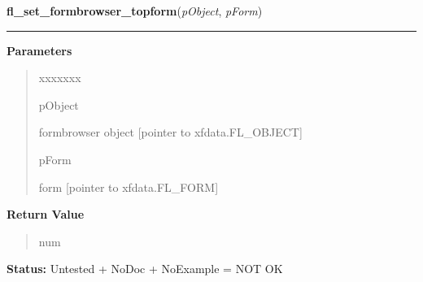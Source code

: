 \hspace{.8\funcindent}\begin{boxedminipage}{\funcwidth}

    \raggedright \textbf{fl\_set\_formbrowser\_topform}(\textit{pObject}, \textit{pForm})

    \vspace{-1.5ex}

    \rule{\textwidth}{0.5\fboxrule}
\setlength{\parskip}{2ex}
\setlength{\parskip}{1ex}
      \textbf{Parameters}
      \vspace{-1ex}

      \begin{quote}
        \begin{Ventry}{xxxxxxx}

          \item[pObject]

          formbrowser object [pointer to xfdata.FL\_OBJECT]

          \item[pForm]

          form [pointer to xfdata.FL\_FORM]

        \end{Ventry}

      \end{quote}

      \textbf{Return Value}
    \vspace{-1ex}

      \begin{quote}
      num

      \end{quote}

\textbf{Status:} Untested + NoDoc + NoExample = NOT OK



    \end{boxedminipage}

    \label{xformslib:library:fl_set_formbrowser_topform_bynumber}

    \vspace{0.5ex}

